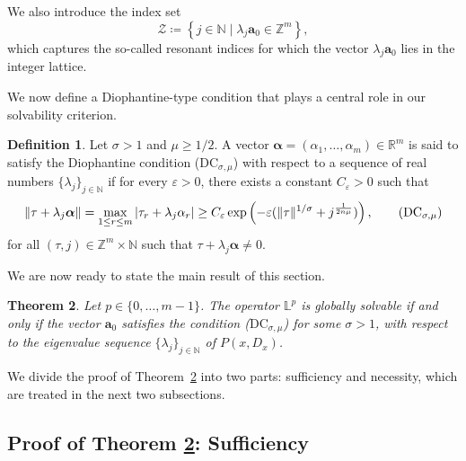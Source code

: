 \documentclass[12pt,reqno]{amsart}
\newtheorem{theorem}{Theorem}[section]
\theoremstyle{definition}
\newtheorem{definition}[theorem]{Definition}
\numberwithin{equation}{section}
\begin{document}
We also introduce the index set
\begin{equation}\label{set_Z}
	\mathcal{Z} \coloneqq \left\{ j \in \mathbb{N} \mid \lambda_j \boldsymbol{a}_0 \in \mathbb{Z}^m \right\},
\end{equation}
which captures the so-called resonant indices for which the vector $\lambda_j \boldsymbol{a}_0$ lies in the integer lattice.

We now define a Diophantine-type condition that plays a central role in our solvability criterion.

\begin{definition}
	Let $\sigma > 1$ and $\mu \geq 1/2$. A vector $\boldsymbol{\alpha} = (\alpha_1, \ldots, \alpha_m) \in \mathbb{R}^m$ is said to satisfy the Diophantine condition ($\mathrm{DC}_{\sigma,\mu}$) with respect to a sequence of real numbers $\{\lambda_j\}_{j \in \mathbb{N}}$ if for every $\varepsilon > 0$, there exists a constant $C_\varepsilon > 0$ such that
	\begin{equation}\label{DC}
		\| \tau + \lambda_j \boldsymbol{\alpha} \| = \max_{1\leq r\leq m}|\tau_r+\lambda_j \alpha_r| \geq C_{\varepsilon} \exp \left(-\varepsilon(\|\tau\|^{1/\sigma} + j^{\frac{1}{2n\mu}})\right), \tag{$\mathrm{DC}_{\sigma,\mu}$}
	\end{equation}
	for all $(\tau, j) \in \mathbb{Z}^m \times \mathbb{N}$ such that $\tau + \lambda_j \boldsymbol{\alpha} \neq 0$.
\end{definition}

We are now ready to state the main result of this section.

\begin{theorem}\label{thm_GS}
	Let $p \in \{0, \ldots, m-1\}$. The operator $\mathbb{L}^p$ is globally solvable if and only if the vector $\boldsymbol{a}_0$ satisfies the condition {\em (}$\mathrm{DC}_{\sigma,\mu}${\em )} for some $\sigma > 1$, with respect to the eigenvalue sequence $\{\lambda_j\}_{j \in \mathbb{N}}$ of $P(x,D_x)$.
\end{theorem}

We divide the proof of Theorem~\ref{thm_GS} into two parts: sufficiency and necessity, which are treated in the next two subsections.

\subsection{Proof of Theorem \ref{thm_GS}: Sufficiency} \
\end{document}
